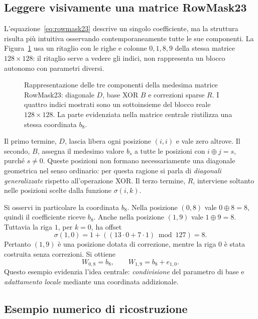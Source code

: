 
\subsection{Leggere visivamente una matrice RowMask23}
\label{sec:guida-visiva-rowmask}

L'equazione~\eqref{eq:rowmask23} descrive un singolo coefficiente, ma la struttura risulta più intuitiva osservando contemporaneamente tutte le sue componenti. La Figura~\ref{fig:tre-componenti-rowmask} usa un ritaglio con le righe e colonne $0,1,8,9$ della stessa matrice $128\times128$: il ritaglio serve a vedere gli indici, non rappresenta un blocco autonomo con parametri diversi.

\begin{figure}[htbp]
\centering

\caption{Rappresentazione delle tre componenti della medesima matrice RowMask23: diagonale $D$, base XOR $B$ e correzioni sparse $R$. I quattro indici mostrati sono un sottoinsieme del blocco reale $128\times128$. La parte evidenziata nella matrice centrale riutilizza una stessa coordinata $b_8$.}
\label{fig:tre-componenti-rowmask}
\end{figure}

Il primo termine, $D$, lascia libera ogni posizione $(i,i)$ e vale zero altrove. Il secondo, $B$, assegna il medesimo valore $b_s$ a tutte le posizioni con $i\oplus j=s$, purché $s\ne0$. Queste posizioni non formano necessariamente una diagonale geometrica nel senso ordinario: per questa ragione si parla di \emph{diagonali generalizzate} rispetto all'operazione XOR. Il terzo termine, $R$, interviene soltanto nelle posizioni scelte dalla funzione $\sigma(i,k)$.

Si osservi in particolare la coordinata $b_8$. Nella posizione $(0,8)$ vale $0\oplus8=8$, quindi il coefficiente riceve $b_8$. Anche nella posizione $(1,9)$ vale $1\oplus9=8$. Tuttavia la riga $1$, per $k=0$, ha offset
\[
\sigma(1,0)=1+((13\cdot0+7\cdot1)\bmod127)=8.
\]
Pertanto $(1,9)$ è una posizione dotata di correzione, mentre la riga $0$ è stata costruita senza correzioni. Si ottiene
\[
W_{0,8}=b_8,\qquad W_{1,9}=b_8+e_{1,0}.
\]
Questo esempio evidenzia l'idea centrale: \emph{condivisione} del parametro di base e \emph{adattamento locale} mediante una coordinata addizionale.

\subsection{Esempio numerico di ricostruzione}
\label{sec:esempio-numerico-rowmask}

